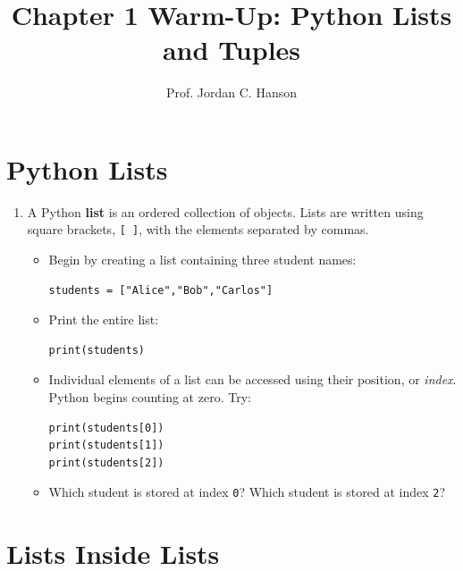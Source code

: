 \documentclass{article}
\begin{document}
\twocolumn

\title{Chapter 1 Warm-Up: Python Lists and Tuples}
\author{Prof. Jordan C. Hanson}

\maketitle

\section{Python Lists}

\begin{enumerate}

\item A Python \textbf{list} is an ordered collection of objects.  Lists are written using square brackets, \texttt{[ ]}, with the elements separated by commas.

\begin{itemize}

\item Begin by creating a list containing three student names:

\begin{verbatim}
students = ["Alice","Bob","Carlos"]
\end{verbatim}

\item Print the entire list:

\begin{verbatim}
print(students)
\end{verbatim}

\item Individual elements of a list can be accessed using their position, or \textit{index}.  Python begins counting at zero.  Try:

\begin{verbatim}
print(students[0])
print(students[1])
print(students[2])
\end{verbatim}

\item Which student is stored at index \texttt{0}?  Which student is stored at index \texttt{2}?

\end{itemize}
\end{enumerate}


\section{Lists Inside Lists}
\end{document}
